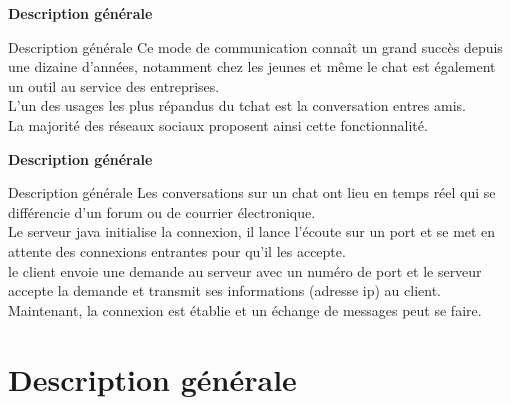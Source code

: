 \documentclass[11pt]{beamer}
\begin{document}
  \begin{frame}{\textbf {Description générale}}      		
   
\begin{block}{Description générale} 
\large
Ce mode de communication connaît un grand succès depuis une dizaine d’années, notamment chez les jeunes et même le chat est également un outil au service des entreprises. \\
L’un des usages les plus répandus du tchat est la conversation entres amis.\\
 La majorité des réseaux sociaux proposent ainsi cette fonctionnalité.
 \end{block}                      

  \end{frame}   
   
  \begin{frame}{\textbf {Description générale }}
              
         \begin{block}{Description générale}
         \large
Les conversations sur un chat ont lieu en temps réel qui se différencie d'un forum ou de courrier électronique.\\
Le serveur java initialise la connexion, il lance l'écoute sur un port et se met en attente des connexions entrantes pour qu'il les accepte.\\
le client envoie une demande au serveur avec un numéro de port et le serveur accepte la demande et transmit ses informations (adresse ip) au client. Maintenant, la connexion est établie et un échange de messages peut se faire.



\end{block}                           
  \end{frame}      		
        	 	
				\section {Description générale}
				
\end{document}
